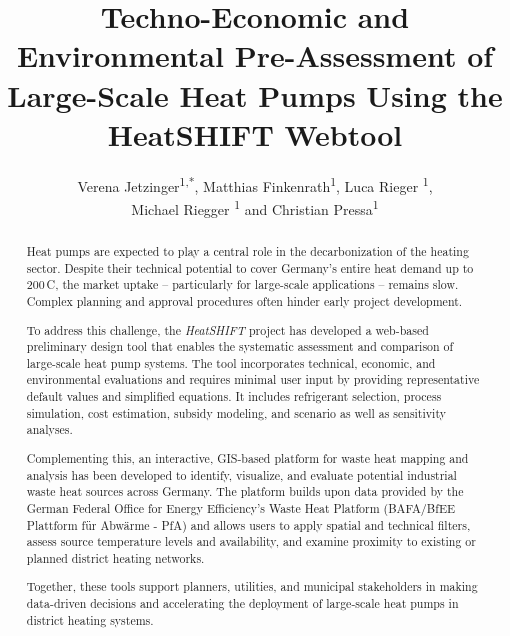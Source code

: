 \documentclass[letterpaper,11pt]{article}
\newcommand\authormark[1]{\textsuperscript{#1}}
\begin{document}
\title{Techno-Economic and Environmental Pre-Assessment of Large-Scale Heat Pumps Using the HeatSHIFT Webtool}


\author{Verena Jetzinger\authormark{1,*}, Matthias Finkenrath\authormark{1}, Luca Rieger \authormark{1}, \\ Michael Riegger \authormark{1} and Christian Pressa\authormark{1}}

\vspace{5mm}

\address{\authormark{1}Institute for Energy and Propulsion Technology, Kempten University of Applied Sciences, Bahnhofstraße 61, 87435 Kempten (Allgäu), Germany}


\email{\authormark{*}verena.jetzinger@hs-kempten.de} %

\thispagestyle{firstpage}

\begin{abstract}
	
	Heat pumps are expected to play a central role in the decarbonization of the heating sector. Despite their technical potential to cover Germany’s entire heat demand up to 200\,\textdegree{}C, the market uptake -- particularly for large-scale applications -- remains slow. Complex planning and approval procedures often hinder early project development.
	
	To address this challenge, the \textit{HeatSHIFT} project has developed a web-based preliminary design tool that enables the systematic assessment and comparison of large-scale heat pump systems. The tool incorporates technical, economic, and environmental evaluations and requires minimal user input by providing representative default values and simplified equations. It includes refrigerant selection, process simulation, cost estimation, subsidy modeling, and scenario as well as sensitivity analyses.
	
	Complementing this, an interactive, GIS-based platform for waste heat mapping and analysis has been developed to identify, visualize, and evaluate potential industrial waste heat sources across Germany. The platform builds upon data provided by the German Federal Office for Energy Efficiency’s Waste Heat Platform (BAFA/BfEE Plattform für Abwärme - PfA) and allows users to apply spatial and technical filters, assess source temperature levels and availability, and examine proximity to existing or planned district heating networks.
	
	Together, these tools support planners, utilities, and municipal stakeholders in making data-driven decisions and accelerating the deployment of large-scale heat pumps in district heating systems.
\end{abstract}
\end{document}
